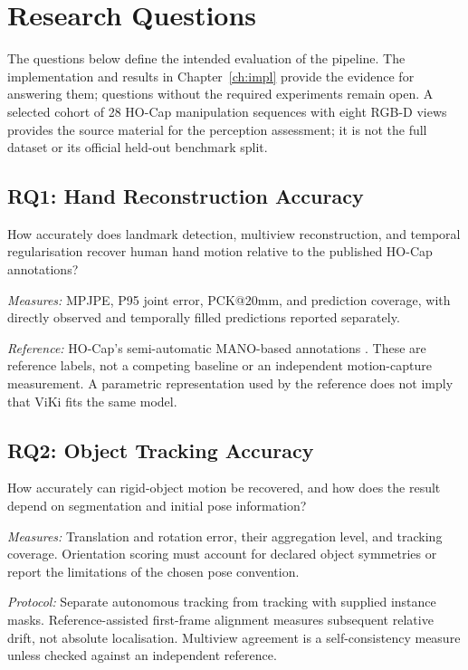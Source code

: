\section{Research Questions}
\label{sec:rq}

The questions below define the intended evaluation of the pipeline. The
implementation and results in Chapter~\ref{ch:impl} provide the evidence for
answering them; questions without the required experiments remain open. A selected cohort of 28 HO-Cap manipulation sequences with eight
RGB-D views provides the source material for the perception assessment; it is
not the full dataset or its official held-out benchmark split.

\subsection*{RQ1: Hand Reconstruction Accuracy}

How accurately does landmark detection, multiview reconstruction, and temporal
regularisation recover human hand motion relative to the published HO-Cap
annotations?

\textit{Measures:} MPJPE, P95 joint error, PCK@20mm, and prediction coverage,
with directly observed and temporally filled predictions reported separately.

\textit{Reference:} HO-Cap's semi-automatic MANO-based annotations
\cite{hocap}. These are reference labels, not a competing baseline or an
independent motion-capture measurement. A parametric representation used by
the reference does not imply that ViKi fits the same model.

\subsection*{RQ2: Object Tracking Accuracy}

How accurately can rigid-object motion be recovered, and how does the result
depend on segmentation and initial pose information?

\textit{Measures:} Translation and rotation error, their aggregation level,
and tracking coverage. Orientation scoring must account for declared object
symmetries or report the limitations of the chosen pose convention.

\textit{Protocol:} Separate autonomous tracking from tracking with supplied
instance masks. Reference-assisted first-frame alignment measures subsequent
relative drift, not absolute localisation. Multiview agreement is a
self-consistency measure unless checked against an independent reference.

